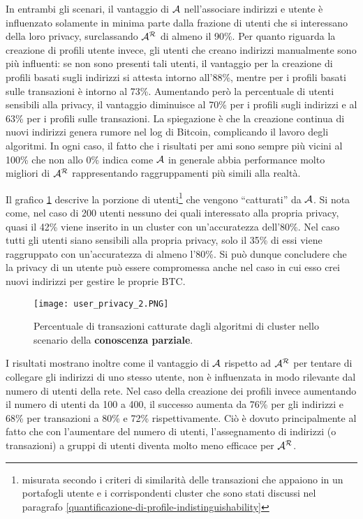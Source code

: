 In entrambi gli scenari, il vantaggio di $\mathcal{A}$ nell'associare indirizzi e utente è influenzato solamente in minima parte dalla frazione di utenti che si interessano della loro privacy, surclassando $\mathcal{A}^\mathcal{R}$ di almeno il 90\%.
Per quanto riguarda la creazione di profili utente invece, gli utenti che creano indirizzi manualmente sono più influenti: se non sono presenti tali utenti, il vantaggio per la creazione di profili basati sugli indirizzi si attesta intorno all'88\%, mentre per i profili basati sulle transazioni è intorno al 73\%. Aumentando però la percentuale di utenti sensibili alla privacy, il vantaggio diminuisce al 70\% per i profili sugli indirizzi e al 63\% per i profili sulle transazioni.
La spiegazione è che la creazione continua di nuovi indirizzi genera rumore nel log di Bitcoin, complicando il lavoro degli algoritmi. In ogni caso, il fatto che i risultati per \gls{ami} sono sempre più vicini al 100\% che non allo 0\% indica come $\mathcal{A}$ in generale abbia performance molto migliori di $\mathcal{A}^\mathcal{R}$ rappresentando raggruppamenti più simili alla realtà.

Il grafico \ref{userprivacy_fig_2} descrive la porzione di utenti\footnote{misurata secondo i criteri di similarità delle transazioni che appaiono in un portafogli utente e i corrispondenti cluster che sono stati discussi nel paragrafo \ref{quantificazione-di-profile-indistinguishability}} che vengono ``catturati'' da $\mathcal{A}$. Si nota come, nel caso di 200 utenti nessuno dei quali interessato alla propria privacy, quasi il 42\%  viene inserito  in un cluster con un'accuratezza dell'80\%. Nel caso tutti gli utenti siano sensibili alla propria privacy, solo il 35\% di essi viene raggruppato con un'accuratezza di almeno l'80\%. Si può dunque concludere che la privacy di un utente può essere compromessa anche nel caso in cui esso crei nuovi indirizzi per gestire le proprie BTC.

\begin{figure}[htbp]
\centering
\texttt{[image: user\_privacy\_2.PNG]}
\caption[Transazioni associate ad utenti con conoscenza parziale]{Percentuale di transazioni catturate dagli algoritmi di cluster nello scenario della \textbf{conoscenza parziale}.\label{userprivacy_fig_2}}
\end{figure}

I risultati mostrano inoltre come il vantaggio di $\mathcal{A}$ rispetto ad $\mathcal{A}^\mathcal{R}$ per tentare di collegare gli indirizzi di uno stesso utente, non è influenzata in modo rilevante dal numero di utenti della rete.
Nel caso della creazione dei profili invece aumentando il numero di utenti da 100 a 400, il successo aumenta da 76\% per gli indirizzi e 68\% per transazioni a 80\% e 72\% rispettivamente. Ciò è dovuto principalmente al fatto che con l'aumentare del numero di utenti, l'assegnamento di indirizzi (o transazioni) a gruppi di utenti diventa molto meno efficace per $\mathcal{A}^\mathcal{R}$.

